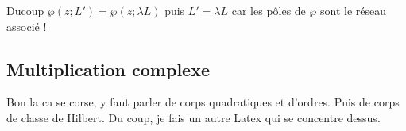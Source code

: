 \documentclass[12pt]{article}
\theoremstyle{plain}
\theoremstyle{definition}
\theoremstyle{remark}
\begin{document}
Ducoup $\wp(z;L')=\wp(z;\lambda L)$ puis $L'=\lambda L$ car les pôles de $\wp$ sont le réseau associé !

\subsection{Multiplication complexe}
Bon la ca se corse, y faut parler de corps quadratiques et d'ordres. Puis de corps de classe de Hilbert. Du coup,
je fais un autre Latex qui se concentre dessus.
\end{document}
